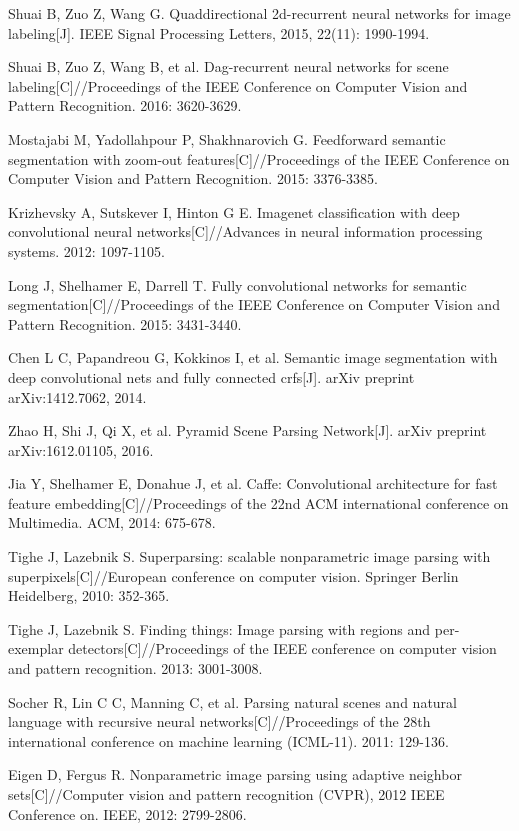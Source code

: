 \documentclass[10.5pt,compsoc]{TsT}
\theoremstyle{mystyle}
\begin{document}
{\begin{thebibliography}{99}
Shuai B, Zuo Z, Wang G. Quaddirectional 2d-recurrent neural networks for image labeling[J]. IEEE Signal Processing Letters, 2015, 22(11): 1990-1994.

Shuai B, Zuo Z, Wang B, et al. Dag-recurrent neural networks for scene labeling[C]//Proceedings of the IEEE Conference on Computer Vision and Pattern Recognition. 2016: 3620-3629.

Mostajabi M, Yadollahpour P, Shakhnarovich G. Feedforward semantic segmentation with zoom-out features[C]//Proceedings of the IEEE Conference on Computer Vision and Pattern Recognition. 2015: 3376-3385.

Krizhevsky A, Sutskever I, Hinton G E. Imagenet classification with deep convolutional neural networks[C]//Advances in neural information processing systems. 2012: 1097-1105.

Long J, Shelhamer E, Darrell T. Fully convolutional networks for semantic segmentation[C]//Proceedings of the IEEE Conference on Computer Vision and Pattern Recognition. 2015: 3431-3440.

Chen L C, Papandreou G, Kokkinos I, et al. Semantic image segmentation with deep convolutional nets and fully connected crfs[J]. arXiv preprint arXiv:1412.7062, 2014.

Zhao H, Shi J, Qi X, et al. Pyramid Scene Parsing Network[J]. arXiv preprint arXiv:1612.01105, 2016.

Jia Y, Shelhamer E, Donahue J, et al. Caffe: Convolutional architecture for fast feature embedding[C]//Proceedings of the 22nd ACM international conference on Multimedia. ACM, 2014: 675-678.

Tighe J, Lazebnik S. Superparsing: scalable nonparametric image parsing with superpixels[C]//European conference on computer vision. Springer Berlin Heidelberg, 2010: 352-365.

Tighe J, Lazebnik S. Finding things: Image parsing with regions and per-exemplar detectors[C]//Proceedings of the IEEE conference on computer vision and pattern recognition. 2013: 3001-3008.

Socher R, Lin C C, Manning C, et al. Parsing natural scenes and natural language with recursive neural networks[C]//Proceedings of the 28th international conference on machine learning (ICML-11). 2011: 129-136.

Eigen D, Fergus R. Nonparametric image parsing using adaptive neighbor sets[C]//Computer vision and pattern recognition (CVPR), 2012 IEEE Conference on. IEEE, 2012: 2799-2806.


\end{thebibliography}}
\end{document}
